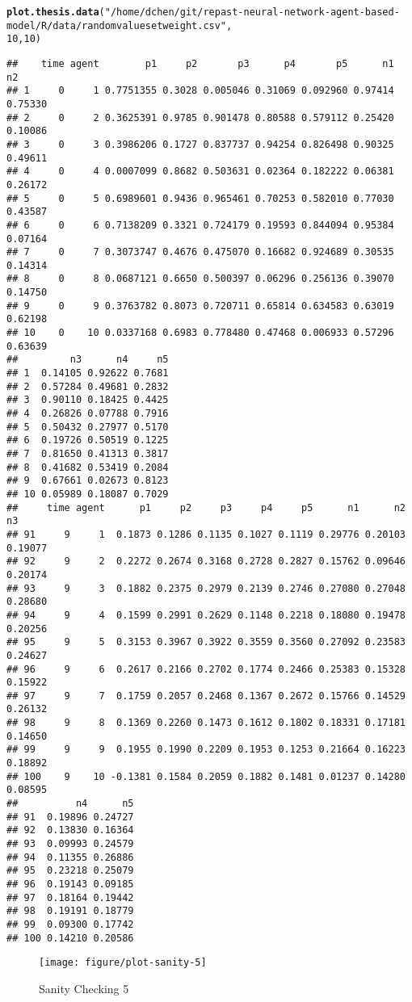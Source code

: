 \documentclass{article}\usepackage[]{graphicx}\usepackage[]{color}
\makeatletter
\def\maxwidth{ %
  \ifdim\Gin@nat@width>\linewidth
    \linewidth
  \else
    \Gin@nat@width
  \fi
}
\newcommand{\hlnum}[1]{\textcolor[rgb]{0.686,0.059,0.569}{#1}}%
\newcommand{\hlstr}[1]{\textcolor[rgb]{0.192,0.494,0.8}{#1}}%
\newcommand{\hlstd}[1]{\textcolor[rgb]{0.345,0.345,0.345}{#1}}%
\newcommand{\hlkwd}[1]{\textcolor[rgb]{0.737,0.353,0.396}{\textbf{#1}}}%
\newenvironment{kframe}{%
 \def\at@end@of@kframe{}%
 \ifinner\ifhmode%
  \def\at@end@of@kframe{\end{minipage}}%
  \begin{minipage}{\columnwidth}%
 \fi\fi%
 \def\FrameCommand##1{\hskip\@totalleftmargin \hskip-\fboxsep
 \colorbox{shadecolor}{##1}\hskip-\fboxsep
     \hskip-\linewidth \hskip-\@totalleftmargin \hskip\columnwidth}%
 \MakeFramed {\advance\hsize-\width
   \@totalleftmargin\z@ \linewidth\hsize
   \@setminipage}}%
 {\par\unskip\endMakeFramed%
 \at@end@of@kframe}
\newenvironment{knitrout}{}{} %
\makeatother
\begin{document}
\begin{knitrout}
\color{fgcolor}\begin{kframe}
\begin{alltt}
\hlkwd{plot.thesis.data}\hlstd{(}\hlstr{"/home/dchen/git/repast-neural-network-agent-based-model/R/data/randomvaluesetweight.csv"}\hlstd{,}
    \hlnum{10}\hlstd{,} \hlnum{10}\hlstd{)}
\end{alltt}
\begin{verbatim}
##    time agent        p1     p2       p3      p4       p5      n1      n2
## 1     0     1 0.7751355 0.3028 0.005046 0.31069 0.092960 0.97414 0.75330
## 2     0     2 0.3625391 0.9785 0.901478 0.80588 0.579112 0.25420 0.10086
## 3     0     3 0.3986206 0.1727 0.837737 0.94254 0.826498 0.90325 0.49611
## 4     0     4 0.0007099 0.8682 0.503631 0.02364 0.182222 0.06381 0.26172
## 5     0     5 0.6989601 0.9436 0.965461 0.70253 0.582010 0.77030 0.43587
## 6     0     6 0.7138209 0.3321 0.724179 0.19593 0.844094 0.95384 0.07164
## 7     0     7 0.3073747 0.4676 0.475070 0.16682 0.924689 0.30535 0.14314
## 8     0     8 0.0687121 0.6650 0.500397 0.06296 0.256136 0.39070 0.14750
## 9     0     9 0.3763782 0.8073 0.720711 0.65814 0.634583 0.63019 0.62198
## 10    0    10 0.0337168 0.6983 0.778480 0.47468 0.006933 0.57296 0.63639
##         n3      n4     n5
## 1  0.14105 0.92622 0.7681
## 2  0.57284 0.49681 0.2832
## 3  0.90110 0.18425 0.4425
## 4  0.26826 0.07788 0.7916
## 5  0.50432 0.27977 0.5170
## 6  0.19726 0.50519 0.1225
## 7  0.81650 0.41313 0.3817
## 8  0.41682 0.53419 0.2084
## 9  0.67661 0.02673 0.8123
## 10 0.05989 0.18087 0.7029
##     time agent      p1     p2     p3     p4     p5      n1      n2      n3
## 91     9     1  0.1873 0.1286 0.1135 0.1027 0.1119 0.29776 0.20103 0.19077
## 92     9     2  0.2272 0.2674 0.3168 0.2728 0.2827 0.15762 0.09646 0.20174
## 93     9     3  0.1882 0.2375 0.2979 0.2139 0.2746 0.27080 0.27048 0.28680
## 94     9     4  0.1599 0.2991 0.2629 0.1148 0.2218 0.18080 0.19478 0.20256
## 95     9     5  0.3153 0.3967 0.3922 0.3559 0.3560 0.27092 0.23583 0.24627
## 96     9     6  0.2617 0.2166 0.2702 0.1774 0.2466 0.25383 0.15328 0.15922
## 97     9     7  0.1759 0.2057 0.2468 0.1367 0.2672 0.15766 0.14529 0.26132
## 98     9     8  0.1369 0.2260 0.1473 0.1612 0.1802 0.18331 0.17181 0.14650
## 99     9     9  0.1955 0.1990 0.2209 0.1953 0.1253 0.21664 0.16223 0.18892
## 100    9    10 -0.1381 0.1584 0.2059 0.1882 0.1481 0.01237 0.14280 0.08595
##          n4      n5
## 91  0.19896 0.24727
## 92  0.13830 0.16364
## 93  0.09993 0.24579
## 94  0.11355 0.26886
## 95  0.23218 0.25079
## 96  0.19143 0.09185
## 97  0.18164 0.19442
## 98  0.19191 0.18779
## 99  0.09300 0.17742
## 100 0.14210 0.20586
\end{verbatim}
\end{kframe}\begin{figure}[]

\texttt{[image: figure/plot-sanity-5]} \caption[Sanity Checking 5]{Sanity Checking 5\label{fig:plot-sanity-5}}
\end{figure}


\end{knitrout}
\end{document}
